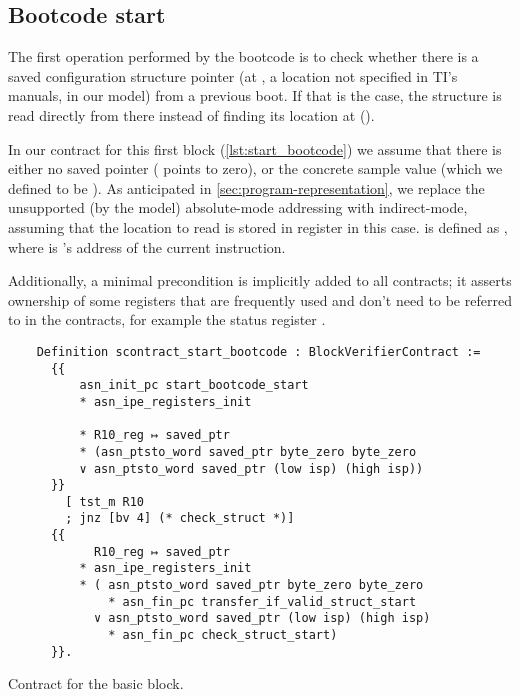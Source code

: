 \subsection{Bootcode start}

The first operation performed by the bootcode is to check whether there is a saved configuration structure pointer (at , a location not specified in TI's manuals,  in our model) from a previous boot. If that is the case, the structure is read directly from there instead of finding its location at  ().

In our contract for this first block (\cref{lst:start_bootcode}) we assume that there is either no saved pointer ( points to zero), or the concrete sample value  (which we defined to be ). As anticipated in \cref{sec:program-representation}, we replace the unsupported (by the model) absolute-mode addressing with indirect-mode, assuming that the location to read is stored in register  in this case.  is defined as , where  is 's address of the current instruction.

Additionally, a minimal precondition is implicitly added to all contracts; it asserts ownership of some registers that are frequently used and don't need to be referred to in the contracts, for example the status register .

\begin{listing}[h]
  \begin{verbatim}
    Definition scontract_start_bootcode : BlockVerifierContract :=
      {{
          asn_init_pc start_bootcode_start
          * asn_ipe_registers_init

          * R10_reg ↦ saved_ptr
          * (asn_ptsto_word saved_ptr byte_zero byte_zero
          ∨ asn_ptsto_word saved_ptr (low isp) (high isp))
      }}
        [ tst_m R10
        ; jnz [bv 4] (* check_struct *)]
      {{
            R10_reg ↦ saved_ptr
          * asn_ipe_registers_init
          * ( asn_ptsto_word saved_ptr byte_zero byte_zero
              * asn_fin_pc transfer_if_valid_struct_start
            ∨ asn_ptsto_word saved_ptr (low isp) (high isp)
              * asn_fin_pc check_struct_start)
      }}.
  \end{verbatim}
  \caption{Contract for the  basic block.}
  \label{lst:start_bootcode}
\end{listing}


